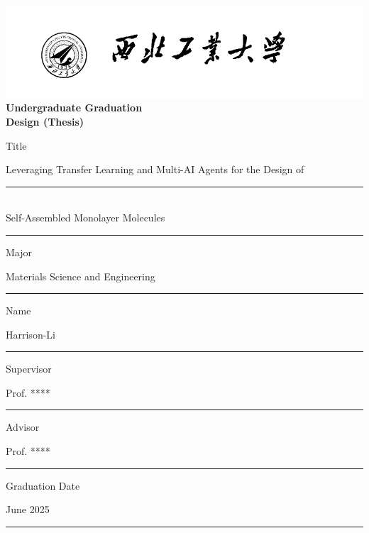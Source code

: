 \documentclass[a4paper,12pt]{mythesisclass}
\begin{document}
	\begin{titlepage}
		\begin{center}
			\includegraphics[scale=0.8]{NPU_logo.png} %
			\\
			\LARGE\textbf{Undergraduate Graduation}\\
			\LARGE\textbf{Design (Thesis)}
		\end{center}
		
		\noindent Title
		
		\begin{center}\vspace{-5mm}
			Leveraging Transfer Learning and Multi-AI Agents for the Design of\\
			\rule{0.8\linewidth}{0.5pt}\\
			Self-Assembled Monolayer Molecules\\
			\rule{0.8\linewidth}{0.5pt}
		\end{center}
		\noindent Major
		\begin{center}\vspace{-5mm}
			Materials Science and Engineering\\
			\rule{0.8\linewidth}{0.5pt}
		\end{center}

		\noindent Name
		\begin{center}\vspace{-5mm}
			Harrison-Li\\
			\rule{0.7\linewidth}{0.5pt}
		\end{center}
        
		\noindent Supervisor
		\begin{center}\vspace{-5mm}
			Prof. ****\\ %
			\noindent\rule{0.7\linewidth}{0.5pt}
		\end{center}
        
		\noindent Advisor
		\begin{center}\vspace{-5mm}
			Prof. ****\\ %
			\noindent\rule{0.7\linewidth}{0.5pt}
		\end{center}
        
		\noindent Graduation Date
		\begin{center}\vspace{-5mm}
			June 2025\\
			\noindent\rule{0.7\linewidth}{0.5pt}
		\end{center}
		
	\end{titlepage}
\end{document}
